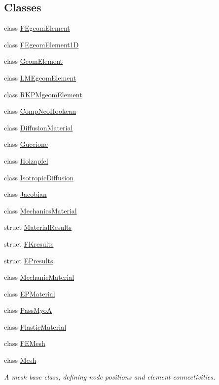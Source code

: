 \subsection*{Classes}
\begin{DoxyCompactItemize}
\item 
class \hyperlink{classvoom_1_1_f_egeom_element}{FEgeomElement}
\item 
class \hyperlink{classvoom_1_1_f_egeom_element1_d}{FEgeomElement1D}
\item 
class \hyperlink{classvoom_1_1_geom_element}{GeomElement}
\item 
class \hyperlink{classvoom_1_1_l_m_egeom_element}{LMEgeomElement}
\item 
class \hyperlink{classvoom_1_1_r_k_p_mgeom_element}{RKPMgeomElement}
\item 
class \hyperlink{classvoom_1_1_comp_neo_hookean}{CompNeoHookean}
\item 
class \hyperlink{classvoom_1_1_diffusion_material}{DiffusionMaterial}
\item 
class \hyperlink{classvoom_1_1_guccione}{Guccione}
\item 
class \hyperlink{classvoom_1_1_holzapfel}{Holzapfel}
\item 
class \hyperlink{classvoom_1_1_isotropic_diffusion}{IsotropicDiffusion}
\item 
class \hyperlink{classvoom_1_1_jacobian}{Jacobian}
\item 
class \hyperlink{classvoom_1_1_mechanics_material}{MechanicsMaterial}
\item 
struct \hyperlink{structvoom_1_1_material_results}{MaterialResults}
\item 
struct \hyperlink{structvoom_1_1_f_kresults}{FKresults}
\item 
struct \hyperlink{structvoom_1_1_e_presults}{EPresults}
\item 
class \hyperlink{classvoom_1_1_mechanic_material}{MechanicMaterial}
\item 
class \hyperlink{classvoom_1_1_e_p_material}{EPMaterial}
\item 
class \hyperlink{classvoom_1_1_pass_myo_a}{PassMyoA}
\item 
class \hyperlink{classvoom_1_1_plastic_material}{PlasticMaterial}
\item 
class \hyperlink{classvoom_1_1_f_e_mesh}{FEMesh}
\item 
class \hyperlink{classvoom_1_1_mesh}{Mesh}
\begin{DoxyCompactList}\small\item\em A mesh base class, defining node positions and element connectivities. \item\end{DoxyCompactList}\item 

\end{DoxyCompactItemize}
